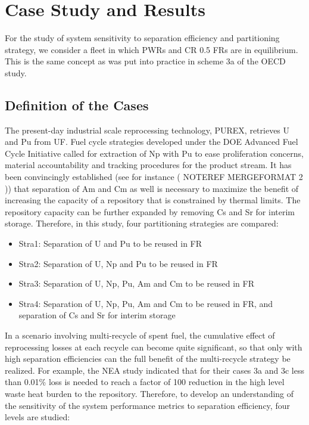 \section{Case Study and Results}
\label{ses_sec:case_study}
For the study of system sensitivity to separation efficiency and
partitioning strategy, we consider a fleet in which PWRs and CR 0.5 FRs
are in equilibrium.  This is the same concept as was put into practice
in scheme 3a of the OECD study.


\subsection{Definition of the Cases}
\label{ses_sec:case_def}
The present-day industrial scale reprocessing technology, PUREX,
retrieves U and Pu from UF. Fuel cycle strategies developed under the
DOE Advanced Fuel Cycle Initiative called for extraction of Np with Pu
to ease proliferation concerns, material accountability and tracking
procedures for the product stream. It has been convincingly established
(see for instance (  NOTEREF 
MERGEFORMAT  2 )) that separation of Am and Cm as well is necessary to
maximize the benefit of increasing the capacity of a repository that is
constrained by thermal limits.  The repository capacity can be further
expanded by removing Cs and Sr for interim storage. Therefore, in this
study, four partitioning strategies are compared:

\begin{itemize}
    \item Stra1: Separation of U and Pu to be reused in FR
    \item Stra2: Separation of U, Np and Pu to be reused in FR
    \item Stra3: Separation of U, Np, Pu, Am and Cm to be reused in FR
    \item Stra4: Separation of U, Np, Pu, Am and Cm to be reused in FR, and
          separation of Cs and Sr for interim storage
\end{itemize}

In a scenario involving multi-recycle of spent fuel, the cumulative
effect of reprocessing losses at each recycle can become quite
significant, so that only with high separation efficiencies can the full
benefit of the multi-recycle strategy be realized.  For example, the NEA
study indicated that for their cases 3a and 3c less than 0.01\% loss is
needed to reach a factor of 100 reduction in the high level waste heat
burden to the repository.  Therefore, to develop an understanding of the
sensitivity of the system performance metrics to separation efficiency,
four levels are studied:

